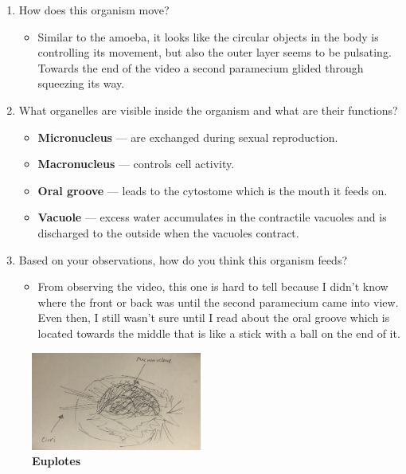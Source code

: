 \documentclass[a4paper]{article}
\begin{document}
\begin{enumerate}
	\item How does this organism move?
	\begin{itemize}
    \item Similar to the amoeba, it looks like the circular objects in the body is controlling its movement, but also the outer layer seems to be pulsating. Towards the end of the video a second paramecium glided through squeezing its way.
  \end{itemize}
	\item What organelles are visible inside the organism and what are their functions?
	\begin{itemize}
    \item \textbf{Micronucleus} — are exchanged during sexual reproduction.
    \item \textbf{Macronucleus} — controls cell activity.
    \item \textbf{Oral groove} — leads to the cytostome which is the mouth it feeds on.
    \item \textbf{Vacuole} — excess water accumulates in the contractile vacuoles and is discharged to the outside when the vacuoles contract.
  \end{itemize}
	\item Based on your observations, how do you think this organism feeds?
	\begin{itemize}
    \item From observing the video, this one is hard to tell because I didn't know where the front or back was until the second paramecium came into view. Even then, I still wasn't sure until I read about the oral groove which is located towards the middle that is like a stick with a ball on the end of it.
  \end{itemize}
\end{enumerate}
\newpage
\begin{figure}[h]
  \centering
  \includegraphics[width=0.5\textwidth]{euplotes.jpeg}
  \caption{\textbf{Euplotes}}
\end{figure}
\end{document}
